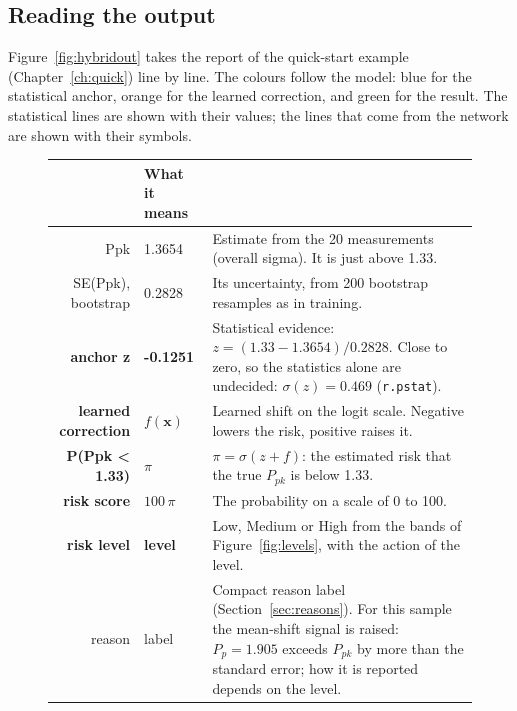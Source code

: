 \documentclass[a4paper,11pt,oneside,openany,parskip=half-,headings=standardclasses,toc=flat,numbers=noenddot]{scrbook}
\renewcommand{\arraystretch}{1.22}
\newcommand{\thead}[1]{{\sffamily\bfseries\footnotesize #1}}
\newcommand{\code}[1]{\texttt{\begingroup\def\_{\textunderscore\allowbreak}#1\endgroup}}
\newcommand{\secref}[1]{Section~\ref{#1}}
\newcommand{\chapref}[1]{Chapter~\ref{#1}}
\newcommand{\figref}[1]{Figure~\ref{#1}}
\begin{document}
\subsection*{Reading the output}

\figref{fig:hybridout} takes the report of the quick-start example (\chapref{ch:quick}) line by line. The colours
follow the model: blue for the statistical anchor, orange for the learned correction, and green for the result.
The statistical lines are shown with their values; the lines that come from the network are shown with their
symbols.

\begin{figure}[!htp]
\small
\renewcommand{\arraystretch}{1.25}
\begin{tabularx}{\textwidth}{@{}>{\ttfamily\footnotesize}r>{\ttfamily\footnotesize}lL@{}}
\toprule
{} & \thead{What it means}\\
\midrule
Ppk & 1.3654 & Estimate from the 20 measurements (overall sigma). It is just above 1.33.\\
SE(Ppk), bootstrap & 0.2828 & Its uncertainty, from 200 bootstrap resamples as in training.\\
\textcolor{accent}{\bfseries anchor z} & \textcolor{accent}{\bfseries -0.1251} & \textcolor{accent}{Statistical evidence:} $z = (1.33 - 1.3654)/0.2828$. Close to zero, so the statistics alone are undecided: $\sigma(z) = 0.469$ (\code{r.p\_stat}).\\
\textcolor{kw}{\bfseries learned correction} & \textcolor{kw}{\bfseries $f(\mathbf{x})$} & \textcolor{kw}{Learned shift} on the logit scale. Negative lowers the risk, positive raises it.\\
\textcolor{goodline}{\bfseries P(Ppk < 1.33)} & \textcolor{goodline}{\bfseries $\pi$} & $\pi = \sigma(z + f)$: the estimated risk that the true $P_{pk}$ is below 1.33.\\
\textcolor{goodline}{\bfseries risk score} & \textcolor{goodline}{\bfseries $100\,\pi$} & The probability on a scale of 0 to 100.\\
\textcolor{goodline}{\bfseries risk level} & \textcolor{goodline}{\bfseries level} & Low, Medium or High from the bands of \figref{fig:levels}, with the action of the level.\\
reason & label & Compact reason label (\secref{sec:reasons}). For this sample the mean-shift signal is raised: $P_p = 1.905$ exceeds $P_{pk}$ by more than the standard error; how it is reported depends on the level.\\

\end{tabularx}
\end{figure}
\end{document}
